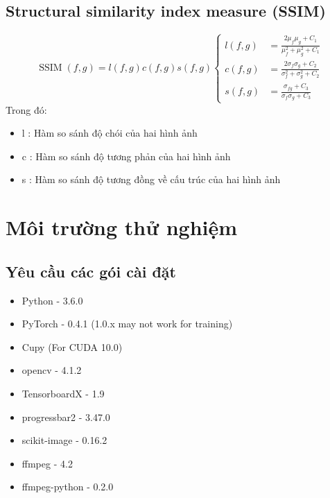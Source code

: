 \subsection{Structural similarity index measure (SSIM)}
\hspace{10mm}{
SSIM là một thước đo chất lượng chuẩn mực được sử dụng để đo lường sự tương đồng giữa hai hình ảnh. Nó được phát triển bởi Wang et al. [No.], được xem là mô phỏng tương quan với nhận thức về chất lượng của hệ thống thị giác của con người (HVS). Khác với việc sử dụng các phương pháp tổng hợp lỗi cổ điển, SSIM được thiết kế để mô hình hóa bất kỳ biến dạng hình ảnh nào dưới dạng kết hợp của ba yếu tố là mất tương quan, méo độ chói và méo tương phản. SSIM được định nghĩa là:
}
\begin{equation}
\operatorname{SSIM}(f, g)=l(f, g) c(f, g) s(f, g)
\left\{\begin{aligned} l(f, g) &=\frac{2 \mu_{f} \mu_{g}+C_{1}}{\mu_{f}^{2}+\mu_{g}^{2}+C_{1}} \\ c(f, g) &=\frac{2 \sigma_{f} \sigma_{g}+C_{2}}{\sigma_{f}^{2}+\sigma_{g}^{2}+C_{2}} \\ s(f, g) &=\frac{\sigma_{f g}+C_{3}}{\sigma_{f} \sigma_{g}+C_{3}} \end{aligned}\right.
\end{equation}
Trong đó:
\begin{itemize}
    \item l : Hàm so sánh độ chói của hai hình ảnh
    \item c : Hàm so sánh độ tương phản của hai hình ảnh
    \item s : Hàm so sánh độ tương đồng về cấu trúc của hai hình ảnh
\end{itemize}

\section{Môi trường thử nghiệm}
\subsection{Yêu cầu các gói cài đặt}
\begin{itemize}
    \item Python - 3.6.0 
    \item PyTorch - 0.4.1 (1.0.x may not work for training)
    \item Cupy (For CUDA 10.0) 
    \item opencv -  4.1.2
    \item TensorboardX - 1.9
    \item progressbar2 - 3.47.0
    \item scikit-image - 0.16.2
    \item ffmpeg - 4.2
    \item ffmpeg-python - 0.2.0
\end{itemize}
